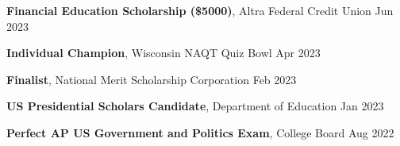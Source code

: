 \documentclass[11pt]{article}       %
\begin{document}
\vspace{5pt}

\textbf{Financial Education Scholarship (\$5000)}, Altra Federal Credit Union \hfill Jun 2023 \\

\vspace{5pt}

\textbf{Individual Champion}, Wisconsin NAQT Quiz Bowl \hfill Apr 2023 \\

\vspace{5pt}

\textbf{Finalist}, National Merit Scholarship Corporation \hfill Feb 2023 \\

\vspace{5pt}

\textbf{US Presidential Scholars Candidate}, Department of Education \hfill Jan 2023 \\

\vspace{5pt}

\textbf{Perfect AP US Government and Politics Exam}, College Board \hfill Aug 2022
\end{document}
